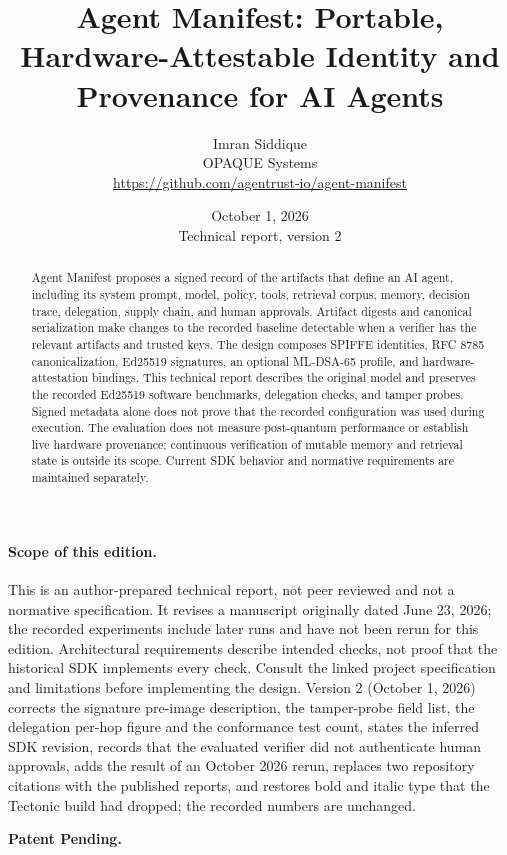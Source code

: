 \documentclass[10pt,letterpaper]{article}
\title{\textbf{Agent Manifest: Portable, Hardware-Attestable Identity and
Provenance for AI Agents}}
\author{
  Imran Siddique \\
  OPAQUE Systems \\[4pt]
  \normalsize \url{https://github.com/agentrust-io/agent-manifest}
}
\date{October 1, 2026 \\ \small Technical report, version 2}
\begin{document}
\maketitle

\begin{abstract}
Agent Manifest proposes a signed record of the artifacts that define
an AI agent, including its system prompt, model, policy, tools, retrieval corpus,
memory, decision trace, delegation, supply chain, and human approvals. Artifact
digests and canonical serialization make changes to the recorded baseline
detectable when a verifier has the relevant artifacts and trusted keys. The
design composes SPIFFE identities, RFC 8785 canonicalization, Ed25519 signatures,
an optional ML-DSA-65 profile, and hardware-attestation bindings. This technical
report describes the original model and preserves the recorded Ed25519 software
benchmarks, delegation checks, and tamper probes. Signed metadata alone does not
prove that the recorded configuration was used during execution. The evaluation
does not measure post-quantum performance or establish live hardware provenance;
continuous verification of mutable memory and retrieval state is outside its
scope. Current SDK behavior and normative requirements are maintained separately.
\end{abstract}

\paragraph{Scope of this edition.}
This is an author-prepared technical report, not peer reviewed and not a
normative specification. It revises a manuscript originally dated June 23, 2026;
the recorded experiments include later runs and have not been rerun for this
edition. Architectural requirements describe intended checks, not proof that
the historical SDK implements every check. Consult the linked project
specification and limitations before implementing the design.
Version 2 (October 1, 2026) corrects the signature pre-image description, the tamper-probe field
list, the delegation per-hop figure and the conformance test count, states the
inferred SDK revision, records that the evaluated verifier did not authenticate
human approvals, adds the result of an October 2026 rerun, replaces two
repository citations with the published reports, and restores bold and italic
type that the Tectonic build had dropped; the recorded numbers are unchanged.

\noindent\textbf{Patent Pending.}

\tableofcontents
\newpage














\end{document}
